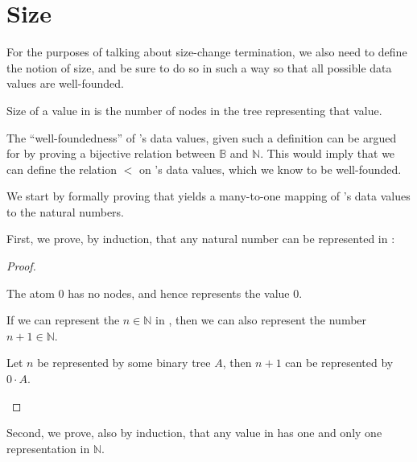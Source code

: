 \section{Size}

For the purposes of talking about size-change termination, we also need to
define the notion of size, and be sure to do so in such a way so that all
possible data values are well-founded.

\begin{definition}\label{definition:size}

Size of a value in \D{} is the number of nodes in the tree representing
that value.

\end{definition}

The ``well-foundedness'' of \D{}'s data values, given such a definition can be
argued for by proving a bijective relation between $\mathbb{B}$ and
$\mathbb{N}$. This would imply that we can define the relation $<$ on \D{}'s
data values, which we know to be well-founded.

We start by formally proving that  yields a many-to-one
mapping of \D{}'s data values to the natural numbers.

First, we prove, by induction, that any natural number can be represented in
\D{}:

\begin{proof}\ \\

\begin{description}[\setleftmargin{70pt}\setlabelstyle{\bf}]

\item [Base] The atom $0$ has no nodes, and hence represents the value $0$.

\item [Assumption] If we can represent the $n\in\mathbb{N}$ in \D{}, then
we can also represent the number $n+1\in\mathbb{N}$. 

\item [Induction] Let $n$ be represented by some binary tree $A$, then $n+1$
can be represented by $0\cdot A$. 

\end{description}

\end{proof}

Second, we prove, also by induction, that any value in \D{} has one and only
one representation in $\mathbb{N}$.

